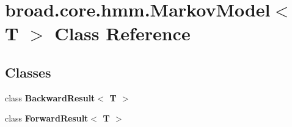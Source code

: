 \hypertarget{classbroad_1_1core_1_1hmm_1_1_markov_model_3_01_t_01_4}{\section{broad.\+core.\+hmm.\+Markov\+Model$<$ T $>$ Class Reference}
\label{classbroad_1_1core_1_1hmm_1_1_markov_model_3_01_t_01_4}
}
\subsection*{Classes}
\begin{DoxyCompactItemize}
\item 
class {\bfseries Backward\+Result$<$ T $>$}
\item 
class {\bfseries Forward\+Result$<$ T $>$}
\end{DoxyCompactItemize}
